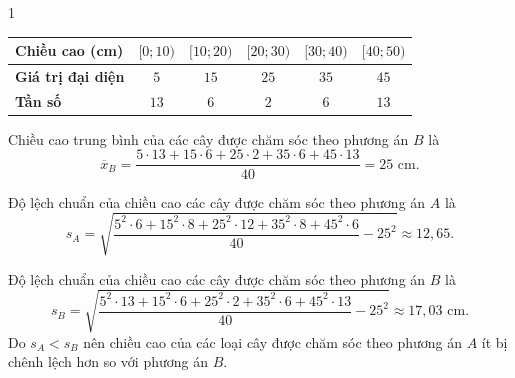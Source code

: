 \begin{ex}
{\begin{enumEX}{1}
\begin{center}
\begin{tabular}{|l|c|c|c|c|c|}
					\hline 
					\textbf{Chiều cao (cm)} & $[0; 10)$ & $ [10; 20)$ & $ [20; 30)$ & $ [30; 40)$ & $ [40; 50)$    \\
					\hline
					\textbf{Giá trị đại diện}&$5$ & $15$ & $25$ & $35$ & $45$  \\ \hline 
					\textbf{Tần số }&$ 13 $& $6$ & $2$ & $6$ & $13$ \\ 
					\hline 
				\end{tabular}
			\end{center}
			Chiều cao trung bình của các cây được chăm sóc theo phương án $B$ là $$\overline{x}_B= \dfrac{5 \cdot 13 + 15 \cdot 6 + 25 \cdot 2 + 35 \cdot 6 + 45 \cdot 13}{40}=25 \text{ cm}.$$
			\item 	Độ lệch chuẩn của chiều cao các cây được chăm sóc theo phương án $A$ là $$s_A =\sqrt{\dfrac{5^2 \cdot 6 + 15^2 \cdot 8 + 25^2 \cdot 12 + 35^2 \cdot 8 + 45 ^2 \cdot 6}{40} - 25^2}\approx 12{,} 65. $$
			\item Độ lệch chuẩn của chiều cao các cây được chăm sóc theo phương án $B$ là $$s_B =\sqrt{\dfrac{5^2 \cdot 13 + 15^2 \cdot 6 + 25^2 \cdot 2 + 35^2 \cdot 6+ 45 ^2 \cdot 13}{40} - 25^2}\approx 17{,} 03 \text{ cm}. $$
			Do $s_A< s_B$ nên chiều cao của các loại cây được chăm sóc theo phương án $A$ ít bị chênh lệch hơn so với phương án $B$.
	\end{enumEX}}
\end{ex}

